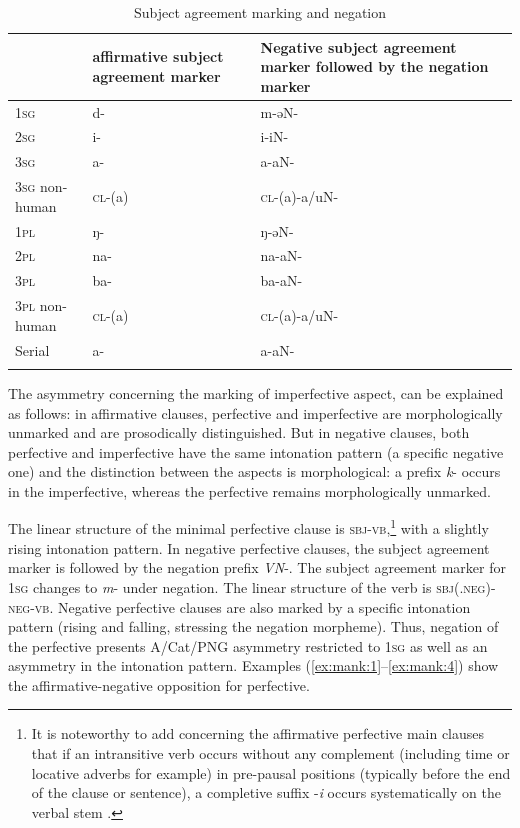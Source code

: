 \documentclass[output=paper,colorlinks,citecolor=brown]{langscibook}
\begin{document}
\begin{table}
\begin{tabularx}{\textwidth}{lQQ}
\lsptoprule
& affirmative subject agreement marker & Negative subject agreement marker followed by the negation marker\\
\midrule
\textsc{1sg} & d- & m-əN-\\
\textsc{2sg} & i- & i-iN-\\
\textsc{3sg} & a- & a-aN-\\
\textsc{3sg} non-human & \textsc{cl}-(a) & \textsc{cl}-(a){}-a/uN-\\
\textsc{1pl} & ŋ- & ŋ-əN-\\
\textsc{2pl} & na- & na-aN-\\
\textsc{3pl} & ba- & ba-aN-\\
\textsc{3pl} non-human & \textsc{cl}-(a) & \textsc{cl}-(a){}-a/uN-\\
Serial & a- & a-aN-\\
\lspbottomrule
\end{tabularx}
\caption{Subject agreement marking and negation}
\label{tab:mank:2}
\end{table}

The asymmetry concerning the marking of imperfective aspect, can be explained as follows: in affirmative clauses, perfective and imperfective are morphologically unmarked and are prosodically distinguished. But in negative clauses, both perfective and imperfective have the same intonation pattern (a specific negative one) and the distinction between the aspects is morphological: a prefix \textit{k}{}- occurs in the imperfective, whereas the perfective remains morphologically unmarked. 

The linear structure of the minimal perfective clause is \textsc{sbj-vb},\footnote{It is noteworthy to add concerning the affirmative perfective main clauses that if an intransitive verb occurs without any complement (including time or locative adverbs for example) in pre-pausal positions (typically before the end of the clause or sentence), a completive suffix -\textit{i} occurs systematically on the verbal stem \citep[for more details, see][80]{Gaved2020}.} with a slightly rising intonation pattern. In negative perfective clauses, the subject agreement marker is followed by the negation prefix \textit{VN}{}-. The subject agreement marker for \textsc{1sg} changes to \textit{m}{}- under negation. The linear structure of the verb is \textsc{sbj(.neg){}-neg-vb}.
Negative perfective clauses are also marked by a specific intonation pattern (rising and falling, stressing the negation morpheme). Thus, negation of the perfective presents A/Cat/PNG asymmetry restricted to \textsc{1sg} as well as an asymmetry in the intonation pattern. Examples (\ref{ex:mank:1}--\ref{ex:mank:4}) show the affirmative-negative opposition for perfective.
\end{document}
